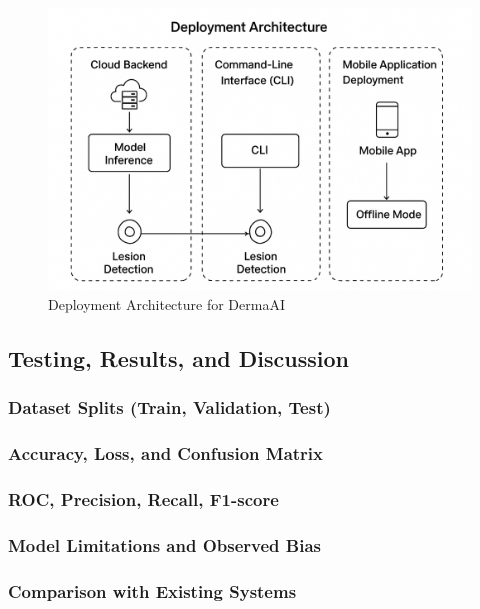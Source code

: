 \documentclass[
  12pt,
  oneside]{article}
\begin{document}
\begin{figure}

{\centering \includegraphics[width=0.7\linewidth]{deployement-architecture} 

}

\caption{Deployment Architecture for DermaAI}\label{fig:unnamed-chunk-17}
\end{figure}

\subsection{Testing, Results, and
Discussion}\label{testing-results-and-discussion}

\subsubsection{Dataset Splits (Train, Validation,
Test)}\label{dataset-splits-train-validation-test}

\subsubsection{Accuracy, Loss, and Confusion
Matrix}\label{accuracy-loss-and-confusion-matrix}

\subsubsection{ROC, Precision, Recall,
F1-score}\label{roc-precision-recall-f1-score}

\subsubsection{Model Limitations and Observed
Bias}\label{model-limitations-and-observed-bias}

\subsubsection{Comparison with Existing
Systems}\label{comparison-with-existing-systems}
\end{document}
